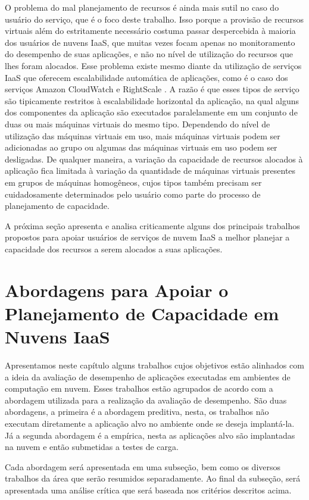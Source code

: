 O problema do mal planejamento de recursos é ainda mais sutil no caso do usuário do serviço, que é o foco deste trabalho. Isso porque a provisão de recursos virtuais além do estritamente necessário costuma passar despercebida à maioria dos usuários de nuvens IaaS, que muitas vezes focam apenas no monitoramento do desempenho de suas aplicações, e não no nível de utilização do recursos que lhes foram alocados. Esse problema existe mesmo diante da utilização de serviços IaaS que oferecem escalabilidade automática de aplicações, como é o caso dos serviços Amazon CloudWatch \cite{amazon_watch} e RightScale \cite{rightscale}. A razão é que esses tipos de serviço são tipicamente restritos à escalabilidade horizontal da aplicação, na qual alguns dos componentes da aplicação são executados paralelamente em um conjunto de duas ou mais máquinas virtuais do mesmo tipo. Dependendo do nível de utilização das máquinas virtuais em uso, mais máquinas virtuais podem ser adicionadas ao grupo ou algumas das máquinas virtuais em uso podem ser desligadas. De qualquer maneira, a variação da capacidade de recursos alocados à aplicação fica limitada à variação da quantidade de máquinas virtuais presentes em grupos de máquinas homogêneos, cujos tipos também precisam ser cuidadosamente determinados pelo usuário como parte do processo de planejamento de capacidade. 

A próxima seção apresenta e analisa criticamente alguns dos principais trabalhos propostos para apoiar usuários de serviços de nuvem IaaS a melhor planejar a capacidade dos recursos a serem alocados a suas aplicações.

\section{Abordagens para Apoiar o Planejamento de Capacidade em Nuvens IaaS}

Apresentamos  neste capítulo alguns trabalhos cujos objetivos estão alinhados 
com a ideia da avaliação de desempenho de aplicações executadas em ambientes de
computação em nuvem. Esses trabalhos estão agrupados de acordo com a abordagem utilizada para a realização da avaliação de desempenho. São duas abordagens, a primeira é a abordagem preditiva, nesta, os trabalhos não executam diretamente a aplicação alvo no ambiente onde se deseja implantá-la. Já a segunda abordagem é a empírica, nesta as aplicações alvo são implantadas na nuvem e então submetidas a testes de carga. 


Cada abordagem será apresentada em uma subseção, bem como os diversos trabalhos da área que serão resumidos separadamente. Ao final da subseção, será apresentada uma análise crítica que será baseada nos critérios descritos acima.

